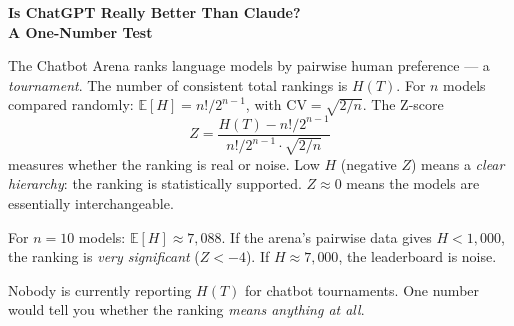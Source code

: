 \documentclass[12pt]{article}
\begin{document}
\begin{center}
{\Large\bfseries Is ChatGPT Really Better Than Claude?\\A One-Number Test}
\end{center}

\medskip

The Chatbot Arena ranks language models by pairwise human preference --- a \emph{tournament}. The number of consistent total rankings is $H(T)$. For $n$ models compared randomly: $\mathbb{E}[H] = n!/2^{n-1}$, with $\mathrm{CV} = \sqrt{2/n}$. The Z-score
\[
Z = \frac{H(T) - n!/2^{n-1}}{n!/2^{n-1} \cdot \sqrt{2/n}}
\]
measures whether the ranking is real or noise. Low $H$ (negative $Z$) means a \emph{clear hierarchy}: the ranking is statistically supported. $Z \approx 0$ means the models are essentially interchangeable.

For $n = 10$ models: $\mathbb{E}[H] \approx 7{,}088$. If the arena's pairwise data gives $H < 1{,}000$, the ranking is \emph{very significant} ($Z < -4$). If $H \approx 7{,}000$, the leaderboard is noise.

Nobody is currently reporting $H(T)$ for chatbot tournaments. One number would tell you whether the ranking \emph{means anything at all}.
\end{document}
